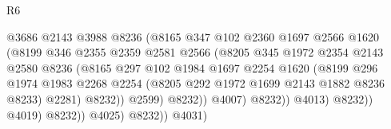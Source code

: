 \begin{lexlean}{R6}
\begin{coremodule}
                                          @3686
                                          @2143
                                          @3988
                                          @8236
                                          (@8165
                                            @347
                                            @102
                                            @2360
                                            @1697
                                            @2566
                                            @1620
                                            (@8199
                                              @346
                                              @2355
                                              @2359
                                              @2581
                                              @2566
                                              (@8205
                                                @345
                                                @1972
                                                @2354
                                                @2143
                                                @2580
                                                @8236
                                                (@8165
                                                  @297
                                                  @102
                                                  @1984
                                                  @1697
                                                  @2254
                                                  @1620
                                                  (@8199
                                                    @296
                                                    @1974
                                                    @1983
                                                    @2268
                                                    @2254
                                                    (@8205 @292 @1972 @1699 @2143 @1882 @8236 @8233)
                                                    @2281)
                                                  @8232))
                                              @2599)
                                            @8232))
                                        @4007)
                                      @8232))
                                  @4013)
                                @8232))
                            @4019)
                          @8232))
                      @4025)
                    @8232))
                @4031)

\end{coremodule}
\end{lexlean}
